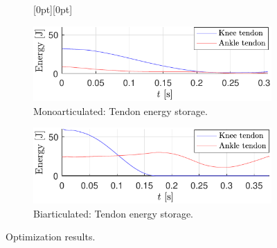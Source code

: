 \documentclass[letterpaper, 10 pt, conference]{ieeeconf}  %
\begin{document}
\begin{figure}[ht]
	\begin{subfigure}[t]{0.32\linewidth}
		\centering
		\raisebox{0pt}[0pt][0pt]{%
		}
	\end{subfigure}
	\begin{subfigure}[t]{0.32\linewidth}
		\includegraphics[width=\linewidth]{mono/ESB_storage}
		\caption{Monoarticulated: Tendon energy storage.}
		\label{fig:mono_ESB}
	\end{subfigure}
	\begin{subfigure}[t]{0.32\linewidth}
		\includegraphics[width=\linewidth]{bi/ESB_storage}
		\caption{Biarticulated: Tendon energy storage.}
		\label{fig:bi_ESB}
	\end{subfigure}
	
	\caption{Optimization results.}
	\label{fig:opt_results}
\end{figure}


\addtolength{\textheight}{-10cm}   %




\end{document}
